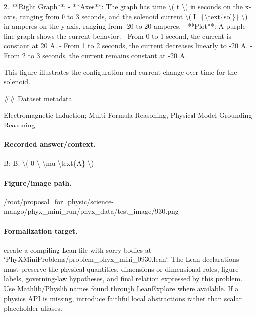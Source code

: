 2. **Right Graph**: 
   - **Axes**: The graph has time \textbackslash{}( t \textbackslash{}) in seconds on the x-axis, ranging from 0 to 3 seconds, and the solenoid current \textbackslash{}( I\_\{\textbackslash{}text\{sol\}\} \textbackslash{}) in amperes on the y-axis, ranging from -20 to 20 amperes.
   - **Plot**: A purple line graph shows the current behavior. 
     - From 0 to 1 second, the current is constant at 20 A.
     - From 1 to 2 seconds, the current decreases linearly to -20 A.
     - From 2 to 3 seconds, the current remains constant at -20 A.

This figure illustrates the configuration and current change over time for the solenoid.

\#\# Dataset metadata

Electromagnetic Induction; Multi-Formula Reasoning, Physical Model Grounding Reasoning

\paragraph{Recorded answer/context.}
B: B: \textbackslash{}( 0 \textbackslash{} \textbackslash{}mu \textbackslash{}text\{A\} \textbackslash{})

\paragraph{Figure/image path.}
/root/proposal\_for\_physic/science-mango/phyx\_mini\_run/phyx\_data/test\_image/930.png

\paragraph{Formalization target.}
create a compiling Lean file with sorry bodies at `PhyXMiniProblems/problem\_phyx\_mini\_0930.lean`. The Lean declarations must preserve the physical quantities, dimensions or dimensional roles, figure labels, governing-law hypotheses, and final relation expressed by this problem.
Use Mathlib/Physlib names found through LeanExplore where available. If a physics API is missing, introduce faithful local abstractions rather than scalar placeholder aliases.

